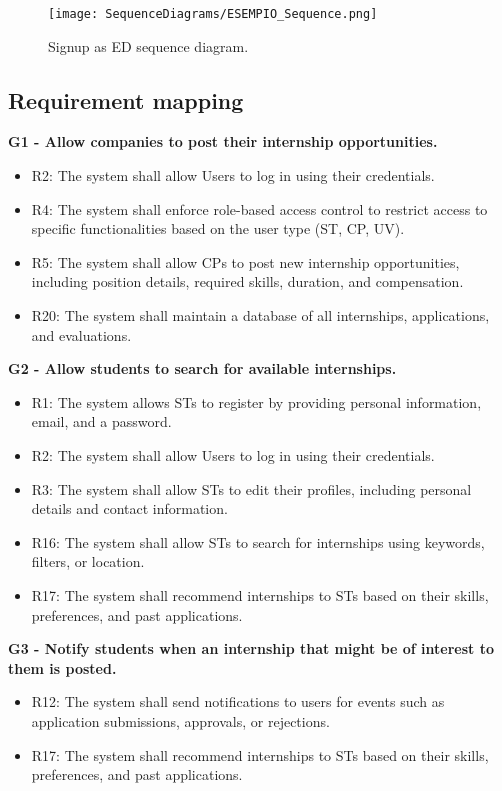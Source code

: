 \begin{figure}[H]
    \begin{center}
        \texttt{[image: SequenceDiagrams/ESEMPIO\_Sequence.png]}
        \caption{Signup as ED sequence diagram.}
        \label{fig:signup_as_ED_seqd}%
    \end{center}
\end{figure}

\newpage

\subsection{Requirement mapping}
\label{subsec:requirement_mapping}%
\textbf{G1 - Allow companies to post their internship opportunities.}
\begin{itemize}
    \item R2: The system shall allow Users to log in using their credentials.
    \item R4: The system shall enforce role-based access control to restrict access to specific functionalities based on the user type (ST, CP, UV).
    \item R5: The system shall allow CPs to post new internship opportunities, including position details, required skills, duration, and compensation.
    \item R20: The system shall maintain a database of all internships, applications, and evaluations.
\end{itemize}

\vspace{1.5cm}
\textbf{G2 - Allow students to search for available internships.}
\begin{itemize}
    \item R1: The system allows STs to register by providing personal information, email, and a password.
    \item R2: The system shall allow Users to log in using their credentials.
    \item R3: The system shall allow STs to edit their profiles, including personal details and contact information.
    \item R16: The system shall allow STs to search for internships using keywords, filters, or location.
    \item R17: The system shall recommend internships to STs based on their skills, preferences, and past applications.
\end{itemize}

\vspace{1.5cm}
\textbf{G3 - Notify students when an internship that might be of interest to them is posted.}
\begin{itemize}
    \item R12: The system shall send notifications to users for events such as application submissions, approvals, or rejections.
    \item R17: The system shall recommend internships to STs based on their skills, preferences, and past applications.
\end{itemize}

